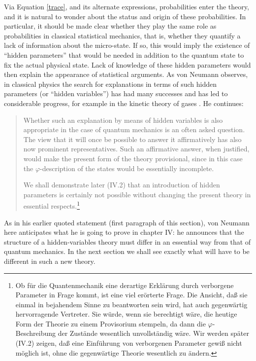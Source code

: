 \documentclass[11pt]{article}
\begin{document}
Via Equation \ref{trace}, and its alternate expressions, probabilities enter the theory, and it is natural to wonder about the status and origin of these probabilities. In particular, it should be made clear whether they play the same role as probabilities in classical statistical mechanics, that is, whether they quantify a lack of information about the micro-state. If so, this would imply the existence of ``hidden parameters'' that would be needed in addition to the quantum state to fix the actual physical state. Lack of knowledge of these hidden parameters would then explain the appearance of statistical arguments. As von Neumann observes, in classical physics the search for explanations in terms of such hidden parameters (or ``hidden variables'') has had many successes and has led to considerable progress, for example in the kinetic theory of gases \cite[p.\@ 109]{VN1}. He continues:
\begin{quote}
  Whether such an explanation by means of hidden variables is also appropriate in the case of quantum mechanics is an often asked question. The view that it will once be possible to answer it affirmatively has also now prominent representatives. Such an affirmative answer, when justified, would make the present form of the theory provisional, since in this case the $\varphi$-description of the states would be essentially incomplete.

  We shall demonstrate later (IV.2) that an introduction of hidden parameters is certainly not possible without changing the present theory in essential respects.\footnote{Ob f\"{u}r die Quantenmechanik eine derartige Erkl\"{a}rung durch verborgene Parameter in Frage kommt, ist eine viel er\"{o}rterte Frage. Die Ansicht, da{\ss} sie einmal in bejahendem Sinne zu beantworten sein wird, hat auch gegenw\"{a}rtig hervorragende Vertreter. Sie w\"{u}rde, wenn sie berechtigt w\"{a}re, die heutige Form der Theorie zu einem Provisorium stempeln, da dann die $\varphi$-Beschreibung der Zust\"{a}nde wesentlich unvollst\"{a}ndig w\"{a}re.
  Wir werden sp\"{a}ter (IV.2) zeigen, da{\ss} eine Einf\"{u}hrung von verborgenen Parameter gewi{\ss} nicht m\"{o}glich ist, ohne die gegenw\"{a}rtige Theorie wesentlich zu \"{a}ndern.}
\end{quote}
As in his earlier quoted statement (first paragraph of this section), von Neumann here anticipates what he is going to prove in chapter IV: he  announces that the structure of a hidden-variables theory must differ in an essential way from that of quantum mechanics. In the next section we shall see exactly what will have to be different in such a new theory.
\end{document}
